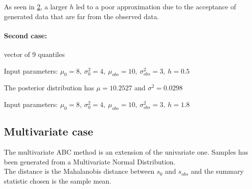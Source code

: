 \documentclass {article}
\begin{document}
\begin{figure}[h!]
	\centering
	\caption{}
	\label{abch18}
\end{figure}
\begin{figure}[h!]
	\centering
	\caption{}
	\label{abch18}
\end{figure}


As seen in \ref{abch18}, a larger $h$ led to a poor approximation due to the acceptance of generated data that are far from the observed data.

\paragraph{Second case:} vector of 9 quantiles 
\begin{center} Input parameters: $\mu_{0}=8,\  \sigma_{0}^2=4,\  \mu_{obs}=10,\  \sigma_{obs}^2 =3,\ h=0.5$  \end{center}


\begin{figure}[h!]
	\centering
	\caption{}
\end{figure}
\begin{figure}[h!]
	\centering
	\caption{}
\end{figure}


The posterior distribution has $\mu=10.2527$ and $\sigma^2=0.0298$ 
\begin{center} Input parameters: $\mu_{0}=8,\  \sigma_{0}^2=4,\  \mu_{obs}=10,\  \sigma_{obs}^2 =3,\ h=1.8$  \end{center}
\begin{figure}[h!]
	\centering
	\caption{}
\end{figure}
\begin{figure}[h!]
	\centering
	\caption{}
\end{figure}

\subsection{Multivariate case}
The multivariate ABC method is an extension of the univariate one. Samples has been generated from a Multivariate Normal Distribution.\\
The distance is the Mahalanobis distance between  $s_{0}$ and $s_{obs}$ and the summary statistic chosen is the sample mean.
\end{document}
